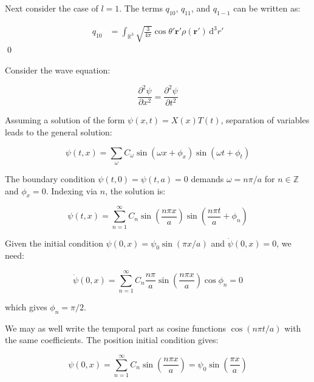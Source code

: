 \documentclass[12pt]{article}
\begin{document}
Next consider the case of $l = 1$. The terms $q_{10}$, $q_{11}$, and $q_{1-1}$ can be written as:

\begin{equation}
\begin{split}
    q_{10} &= \int_{\mathbb{R}^{3}} \sqrt{\frac{3}{4\pi}} \cos{\theta'} \mathbf{r}' \rho(\mathbf{r}') \, \mathrm{d}^{3}r'
\end{split}
\end{equation}
\qed



Consider the wave equation:

\begin{equation}
    \frac{\partial^{2} \psi}{\partial x^{2}} = \frac{\partial^{2} \psi}{\partial t^{2}}
\end{equation}

Assuming a solution of the form $\psi(x, t) = X(x) T(t)$, separation of variables leads to the general solution:

\begin{equation}
    \psi(t, x) = \sum_{\omega} C_{\omega} \sin{(\omega x + \phi_{x})} \sin{(\omega t + \phi_{t})}
\end{equation}

The boundary condition $\psi(t, 0) = \psi(t, a) = 0$ demands $\omega = n \pi/a$ for $n \in \mathbb{Z}$ and $\phi_{x} = 0$. Indexing via $n$, the solution is:

\begin{equation}
    \psi(t, x) = \sum_{n = 1}^{\infty} C_{n} \sin{\left( \frac{n \pi x}{a} \right)} \sin{\left( \frac{n \pi t}{a} + \phi_{n} \right)}
\end{equation}

Given the initial condition $\psi(0, x) = \psi_{0} \sin{(\pi x/a)}$ and $\dot{\psi}(0, x) = 0$, we need:

\begin{equation}
    \dot{\psi}(0, x) = \sum_{n = 1}^{\infty} C_{n} \frac{n \pi}{a} \sin{\left( \frac{n \pi x}{a} \right)} \cos{\phi_{n}} = 0
\end{equation}

which gives $\phi_{n} = \pi/2$.

We may as well write the temporal part as cosine functions $\cos{(n \pi t/a)}$ with the same coefficients. The position initial condition gives:

\begin{equation}
    \psi(0, x) = \sum_{n = 1}^{\infty} C_{n} \sin{\left( \frac{n \pi x}{a} \right)} = \psi_{0} \sin{\left( \frac{\pi x}{a} \right)}
\end{equation}
\end{document}
